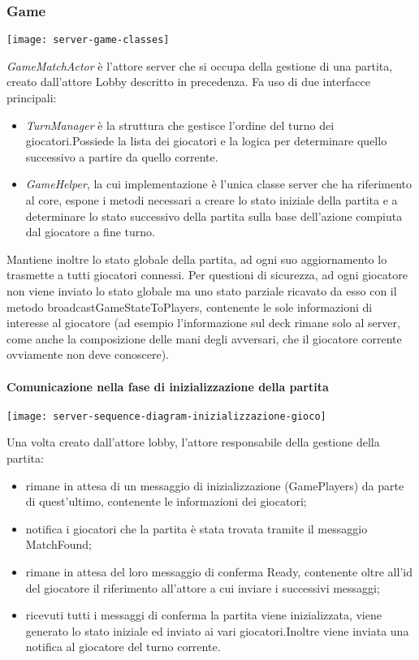 \subsubsection{Game}
\begin{center}
    \texttt{[image: server-game-classes]}
\end{center}
\textit{GameMatchActor} è l’attore server che si occupa della gestione di una partita, creato dall’attore Lobby descritto in precedenza.
Fa uso di due interfacce principali:
\begin{itemize}
    \item \textit{TurnManager} è la struttura che gestisce l'ordine del turno dei giocatori.Possiede la lista dei giocatori e la logica per determinare quello successivo a partire da quello corrente.
    \item \textit{GameHelper}, la cui implementazione è l’unica classe server che ha riferimento al core, espone i metodi necessari a creare lo stato iniziale della partita e a determinare lo stato successivo della partita sulla base dell’azione compiuta dal giocatore a fine turno.
\end{itemize}
Mantiene inoltre lo stato globale della partita, ad ogni suo aggiornamento lo trasmette a tutti giocatori connessi.
Per questioni di sicurezza, ad ogni giocatore non viene inviato lo stato globale ma uno stato parziale ricavato da esso con il metodo broadcastGameStateToPlayers, contenente le sole informazioni di interesse al giocatore (ad esempio l’informazione sul deck rimane solo al server, come anche la composizione delle mani degli avversari, che il giocatore corrente ovviamente non deve conoscere).

\paragraph{Comunicazione nella fase di inizializzazione della partita}
\begin{center}
    \texttt{[image: server-sequence-diagram-inizializzazione-gioco]}
\end{center}
Una volta creato dall’attore lobby, l’attore responsabile della gestione della partita:
\begin{itemize}
    \item rimane in attesa di un messaggio di inizializzazione (GamePlayers) da parte di quest’ultimo, contenente le informazioni dei giocatori;
    \item notifica i giocatori che la partita è stata trovata tramite il messaggio MatchFound;
    \item rimane in attesa del loro messaggio di conferma Ready, contenente oltre all’id del giocatore il riferimento all’attore a cui inviare i successivi messaggi;
    \item ricevuti tutti i messaggi di conferma la partita viene inizializzata, viene generato lo stato iniziale ed inviato ai vari giocatori.Inoltre viene inviata una notifica al giocatore del turno corrente.
\end{itemize}

